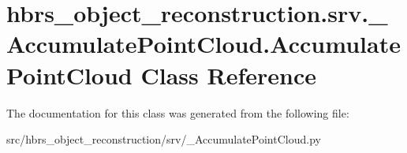 \hypertarget{classhbrs__object__reconstruction_1_1srv_1_1___accumulate_point_cloud_1_1_accumulate_point_cloud}{\section{hbrs\-\_\-object\-\_\-reconstruction.\-srv.\-\_\-\-Accumulate\-Point\-Cloud.\-Accumulate\-Point\-Cloud \-Class \-Reference}
\label{classhbrs__object__reconstruction_1_1srv_1_1___accumulate_point_cloud_1_1_accumulate_point_cloud}
}


\-The documentation for this class was generated from the following file\-:\begin{DoxyCompactItemize}
\item 
src/hbrs\-\_\-object\-\_\-reconstruction/srv/\-\_\-\-Accumulate\-Point\-Cloud.\-py\end{DoxyCompactItemize}

